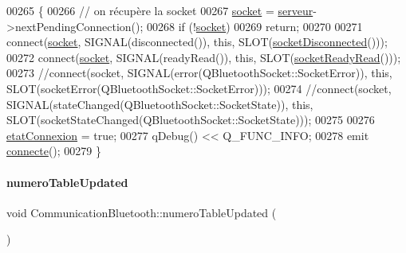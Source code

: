 \begin{DoxyCode}
00265 \{
00266     \textcolor{comment}{// on récupère la socket}
00267     \hyperlink{class_communication_bluetooth_aa07c388515488b3d38d37f1518bfd9d2}{socket} = \hyperlink{class_communication_bluetooth_ace7c3b582db4257a20eb873ebfdf368a}{serveur}->nextPendingConnection();
00268     \textcolor{keywordflow}{if} (!\hyperlink{class_communication_bluetooth_aa07c388515488b3d38d37f1518bfd9d2}{socket})
00269         \textcolor{keywordflow}{return};
00270 
00271     connect(\hyperlink{class_communication_bluetooth_aa07c388515488b3d38d37f1518bfd9d2}{socket}, SIGNAL(disconnected()), \textcolor{keyword}{this}, SLOT(\hyperlink{class_communication_bluetooth_a87e96f5362c1334adb3c930566ca9b88}{socketDisconnected}()));
00272     connect(\hyperlink{class_communication_bluetooth_aa07c388515488b3d38d37f1518bfd9d2}{socket}, SIGNAL(readyRead()), \textcolor{keyword}{this}, SLOT(\hyperlink{class_communication_bluetooth_a28b131a307d4a799f4f8d7b6969fa9ca}{socketReadyRead}()));
00273     \textcolor{comment}{//connect(socket, SIGNAL(error(QBluetoothSocket::SocketError)), this,
       SLOT(socketError(QBluetoothSocket::SocketError)));}
00274     \textcolor{comment}{//connect(socket, SIGNAL(stateChanged(QBluetoothSocket::SocketState)), this,
       SLOT(socketStateChanged(QBluetoothSocket::SocketState)));}
00275 
00276     \hyperlink{class_communication_bluetooth_ae6ab740d6e6673fcc9a9f141bd295bc4}{etatConnexion} = \textcolor{keyword}{true};
00277     qDebug() << Q\_FUNC\_INFO;
00278     emit \hyperlink{class_communication_bluetooth_a76f44488775d68071d43b418a7a1c75e}{connecte}();
00279 \}
\end{DoxyCode}
\mbox{\label{class_communication_bluetooth_af17d5f3fa7f55dc02d6f4a6680ec0450}} 
\paragraph{\texorpdfstring{numero\+Table\+Updated}{numeroTableUpdated}}
{\footnotesize\ttfamily void Communication\+Bluetooth\+::numero\+Table\+Updated (\begin{DoxyParamCaption}{ }\end{DoxyParamCaption})\hspace{0.3cm}{\ttfamily [signal]}}

